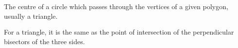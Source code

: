 The centre of a circle which passes through the vertices of a given polygon, 
usually a triangle.
\par
For a triangle, it is the same as the point of intersection of the perpendicular
bisectors of the three sides.